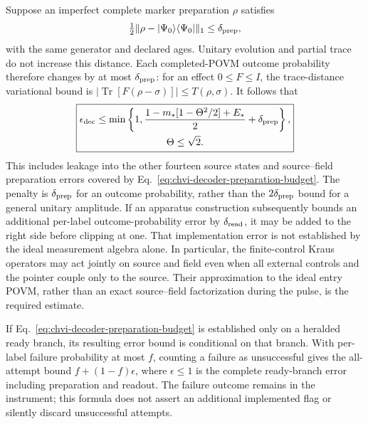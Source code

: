 Suppose an imperfect complete marker preparation $\rho$ satisfies
\begin{equation}
 \tfrac12\|\rho-|\Psi_0\rangle\langle\Psi_0|\|_1
 \leq\delta_{\rm prep},
\label{eq:chvi-decoder-preparation-budget}
\end{equation}
with the same generator and declared ages. Unitary evolution and partial
trace do not increase this distance. Each completed-POVM outcome
probability therefore changes by at most $\delta_{\rm prep}$: for an
effect $0\leq F\leq I$, the trace-distance variational bound is
$|\operatorname{Tr}[F(\rho-\sigma)]|\leq T(\rho,\sigma)$.
It follows that
\begin{equation}
\begin{gathered}
\boxed{\begin{gathered}
 \epsilon_{\rm dec}\leq
 \min\left\{1,
 \frac{1-m_*[1-\Theta^2/2]+E_*}{2}+\delta_{\rm prep}
 \right\},\\
 \Theta\leq\sqrt2.
 \end{gathered}}
\end{gathered}
\label{eq:chvi-decoder-total-error}
\end{equation}
This includes leakage into the other fourteen source states and
source--field preparation errors covered by
Eq.~\eqref{eq:chvi-decoder-preparation-budget}. The penalty is
$\delta_{\rm prep}$ for an outcome probability, rather than the
$2\delta_{\rm prep}$ bound for a general unitary amplitude.
If an apparatus construction subsequently bounds an additional per-label
outcome-probability error by $\delta_{\rm read}$, it may be added to
the right side before clipping at one. That implementation error is not
established by the ideal measurement algebra alone. In particular, the
finite-control Kraus operators may act jointly on source and field even
when all external controls and the pointer couple only to the source.
Their approximation to the ideal entry POVM, rather than an exact
source--field factorization during the pulse, is the required estimate.

If Eq.~\eqref{eq:chvi-decoder-preparation-budget} is established only on a
heralded ready branch, its resulting error bound is conditional on that
branch. With per-label failure probability at most $f$, counting a
failure as unsuccessful gives the all-attempt bound
$f+(1-f)\epsilon$, where $\epsilon\leq1$ is the complete ready-branch
error including preparation and readout. The failure outcome remains in
the instrument; this formula does not assert an additional implemented
flag or silently discard unsuccessful attempts.

